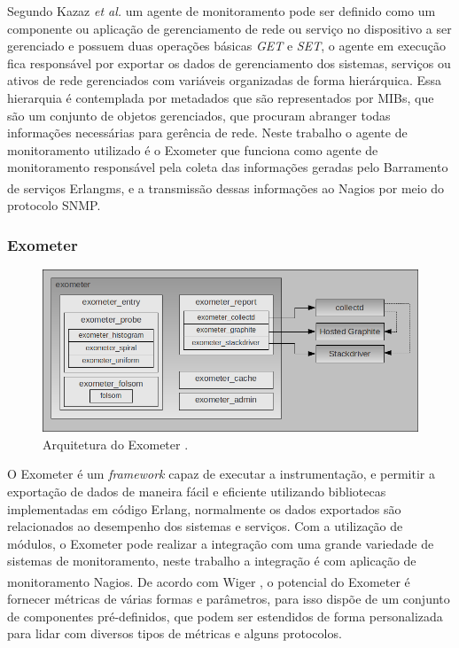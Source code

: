  Segundo Kazaz \textit{et al.}  \cite{6240708} um agente de monitoramento pode ser definido como um componente ou aplicação de gerenciamento de rede ou serviço no dispositivo a ser gerenciado e possuem duas operações básicas \textit{GET} e \textit{SET}, o agente em execução fica responsável por exportar os dados de gerenciamento dos sistemas, serviços ou ativos de rede gerenciados com variáveis organizadas de forma hierárquica. Essa hierarquia é contemplada por metadados que são representados por \acrshort{MIBs}, que são um conjunto de objetos gerenciados, que procuram abranger todas informações necessárias para gerência de rede. Neste trabalho o agente de monitoramento utilizado é o Exometer que funciona como agente de monitoramento responsável pela coleta das informações geradas pelo Barramento de serviços Erlangms, e a transmissão dessas informações ao Nagios\textsuperscript{\textregistered} por meio do protocolo \acrshort{SNMP}. 


\subsubsection{Exometer}

\begin{figure}[H]
	\begin{center}
	\includegraphics[scale = 0.60]{img/exometer_overview.png}
		\caption{Arquitetura do Exometer \cite{exometer_core}.}
		\label{fun:fig:zabbix}
	\end{center}
\end{figure}
O Exometer é um \textit{framework} capaz de executar a instrumentação, e permitir a exportação de dados de maneira fácil e eficiente utilizando bibliotecas implementadas em código Erlang, normalmente os dados exportados são relacionados ao desempenho dos sistemas e serviços. Com a utilização de módulos, o Exometer pode realizar a integração com uma grande variedade de sistemas de monitoramento, neste trabalho a integração é com aplicação de monitoramento Nagios\textsuperscript{\textregistered}. De acordo com Wiger \cite{exometer_core}, o potencial do Exometer é fornecer métricas de várias formas e parâmetros, para isso dispõe de um conjunto de componentes pré-definidos, que podem ser estendidos de forma personalizada para lidar com diversos tipos de métricas e alguns protocolos.

